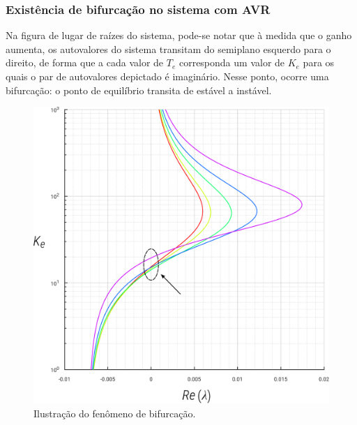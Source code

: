 \documentclass[10pt, compress,xcolor={svgnames,dvipsnames,x11names}]{beamer}
\begin{document}
\begin{frame}%
\frametitle{Existência de bifurcação no sistema com AVR}
\scriptsize

	Na figura de lugar de raízes do sistema, pode-se notar que à medida que o ganho aumenta, os autovalores do sistema transitam do semiplano esquerdo para o direito, de forma que a cada valor de $T_e$ corresponda um valor de $K_e$ para os quais o par de autovalores depictado é imaginário. Nesse ponto, ocorre uma bifurcação: o ponto de equilíbrio transita de estável a instável.
\begin{figure}[htb]
	\begin{center}
	    \includegraphics[width = 0.5\columnwidth]{../images/presentation/existenciaDeBifurcacao.pdf}
	\end{center}
	\caption{\label{fig::existenciaDeBifurcacao} Ilustração do fenômeno de bifurcação.}
\end{figure}
\normalsize
\end{frame}%
\end{document}

